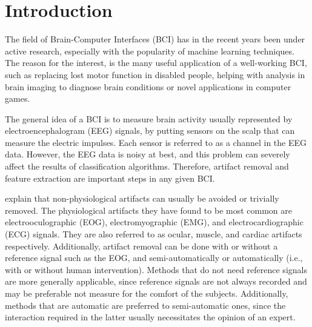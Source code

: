 \section{Introduction}\label{sec:introduction}
The field of Brain-Computer Interfaces (BCI) has in the recent years been under active research, especially with the popularity of machine learning techniques. The reason for the interest, is the many useful application of a well-working BCI, such as replacing lost motor function in disabled people, helping with analysis in brain imaging to diagnose brain conditions or novel applications in computer games. 

The general idea of a BCI is to measure brain activity usually represented by electroencephalogram (EEG) signals, by putting sensors on the scalp that can measure the electric impulses. Each sensor is referred to as a channel in the EEG data. However, the EEG data is noisy at best, and this problem can severely affect the results of classification algorithms. Therefore, artifact removal and feature extraction are important steps in any given BCI.

\cite{uriguen2015eeg} explain that non-physiological artifacts can usually be avoided or trivially removed. The physiological artifacts they have found to be most common are electrooculographic (EOG), electromyographic (EMG), and electrocardiographic (ECG) signals. They are also referred to as ocular, muscle, and cardiac artifacts respectively. Additionally, artifact removal can be done with or without a reference signal such as the EOG, and semi-automatically or automatically (i.e., with or without human intervention). Methods that do not need reference signals are more generally applicable, since reference signals are not always recorded and may be preferable not measure for the comfort of the subjects. Additionally, methods that are automatic are preferred to semi-automatic ones, since the interaction required in the latter usually necessitates the opinion of an expert.

